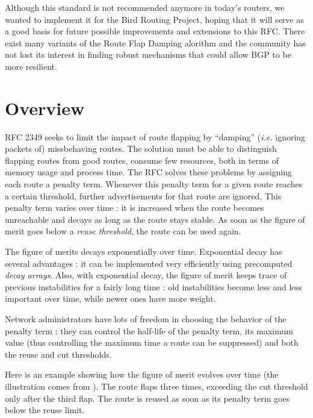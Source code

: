 \documentclass[a4paper,english]{IEEEtran}
\begin{document}
Although this standard is not recommended anymore\cite{ripe recommendations}
in today's routers, we wanted to implement it for the Bird Routing
Project\cite{bird}, hoping that it will serve as a good basis for
future possible improvements and extensions to this RFC. There exist
many variants of the Route Flap Damping alorithm and the community
has not lost its interest in finding robust mechanisms that could
allow BGP to be more resilient. 

\section{Overview}

RFC 2349 seeks to limit the impact of route flapping by ``damping'' (\textit{i.e.} ignoring packets of) missbehaving routes.
The solution must be able to distinguish flapping routes from good routes, consume few resources, both in terms of memory usage and process time.
The RFC solves these problems by assigning each route a penalty term.
Whenever this penalty term for a given route reaches a certain threshold, further advertisements for that route are ignored.
This penalty term varies over time : it is increased when the route becomes unreachable and decays as long as the route stays stable.
As soon as the figure of merit goes below a \textit{reuse threshold}, the route can be used again.

The figure of merits decays exponentially over time.
Exponential decay has several advantages : it can be implemented very efficiently using precomputed \textit{decay arrays}.
Also, with exponential decay, the figure of merit keeps trace of previous instabilities for a fairly long time : old instabilities become less and less important over time, while newer ones have more weight.

Network administrators have lots of freedom in choosing the behavior of the penalty term : they can control the half-life of the penalty term, its maximum value (thus controlling the maximum time a route can be suppressed) and both the reuse and cut thresholds.

Here is an example showing how the figure of merit evolves over time (the illustration comes from \cite{damping-pic}).
The route flaps three times, exceeding the cut threshold only after the third flap.
The route is reused as soon as its penalty term goes below the reuse limit.
\end{document}
